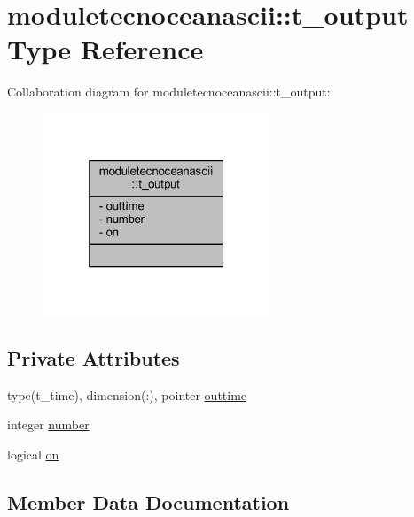 \hypertarget{structmoduletecnoceanascii_1_1t__output}{}\section{moduletecnoceanascii\+:\+:t\+\_\+output Type Reference}
\label{structmoduletecnoceanascii_1_1t__output}


Collaboration diagram for moduletecnoceanascii\+:\+:t\+\_\+output\+:\nopagebreak
\begin{figure}[H]
\begin{center}
\leavevmode
\includegraphics[width=193pt]{structmoduletecnoceanascii_1_1t__output__coll__graph}
\end{center}
\end{figure}
\subsection*{Private Attributes}
\begin{DoxyCompactItemize}
\item 
type(t\+\_\+time), dimension(\+:), pointer \mbox{\hyperlink{structmoduletecnoceanascii_1_1t__output_a7f2b5ac343e033a4ecd53b766c15562e}{outtime}}
\item 
integer \mbox{\hyperlink{structmoduletecnoceanascii_1_1t__output_a0ab306c1dbc70265b8278cd5f95b7930}{number}}
\item 
logical \mbox{\hyperlink{structmoduletecnoceanascii_1_1t__output_abd1750e484260cb9c4e8e5dce7e763aa}{on}}
\end{DoxyCompactItemize}


\subsection{Member Data Documentation}
\mbox{\label{structmoduletecnoceanascii_1_1t__output_a0ab306c1dbc70265b8278cd5f95b7930}} 
